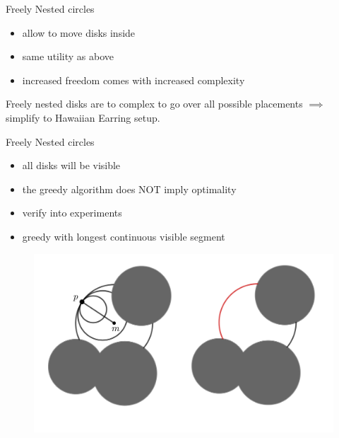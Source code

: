 \documentclass{beamer}
\begin{document}
\begin{frame}{Freely Nested circles}
  \begin{itemize}
      \item allow to move disks inside
      \item same utility as above
      \item increased freedom comes with increased complexity
  \end{itemize}
  Freely nested disks are to complex to go over all possible placements $\implies$ simplify to Hawaiian Earring setup.
\end{frame}

\begin{frame}{Freely Nested circles}
  
  \begin{itemize}
      \item all disks will be visible
      \item the greedy algorithm does NOT imply optimality
      \item verify into experiments
      \item greedy with longest continuous visible segment
  \end{itemize}
  
  \begin{figure}[h]
    \centering
      \includegraphics[width=0.9\linewidth]{slides/assets/hawaiian_utility.png}
  \end{figure}
  
\end{frame}
\end{document}
